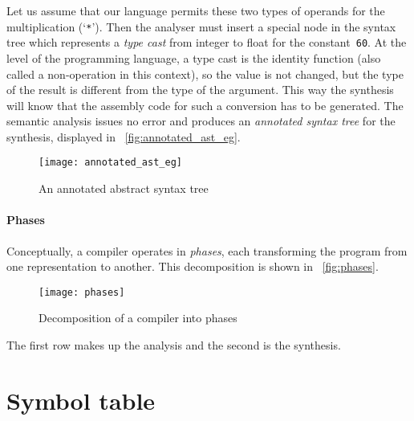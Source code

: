 Let us assume that our language permits these two types of operands
for the multiplication (`\texttt{*}'). Then the analyser must insert a
special node in the syntax tree which represents a \emph{type cast}
from integer to float for the constant~\texttt{60}. At the level of
the programming language, a type cast is the identity function (also
called a non\hyp{}operation in this context), so the value is not
changed, but the type of the result is different from the type of the
argument. This way the synthesis will know that the assembly code for
such a conversion has to be generated. The semantic analysis issues no
error and produces an
\emph{annotated syntax tree} for the synthesis, displayed in
\fig~\vref{fig:annotated_ast_eg}.
\begin{figure}
\centering
\texttt{[image: annotated\_ast\_eg]}
\caption{An annotated abstract syntax tree}
\label{fig:annotated_ast_eg}
\end{figure}

\paragraph{Phases}

Conceptually, a compiler operates in \emph{phases}, each transforming
the program from one representation to another. This decomposition is
shown in \fig~\vref{fig:phases}.
\begin{figure}
\centering
\texttt{[image: phases]}
\caption{Decomposition of a compiler into phases}
\label{fig:phases}
\end{figure}
The first row makes up the analysis and the second is the synthesis.

\section*{Symbol table}

